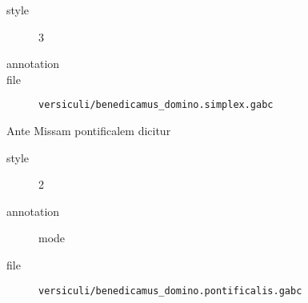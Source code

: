 \begin{gabc}
\begin{description}
\item[style] 3
\item[annotation] 
\item[file] \verb|versiculi/benedicamus_domino.simplex.gabc|
\end{description}
\end{gabc}

\begin{remplacement}
Ante Missam pontificalem dicitur
\end{remplacement}

\begin{gabc}
\begin{description}
\item[style] 2
\item[annotation] mode
\item[file] \verb|versiculi/benedicamus_domino.pontificalis.gabc|
\end{description}
\end{gabc}



